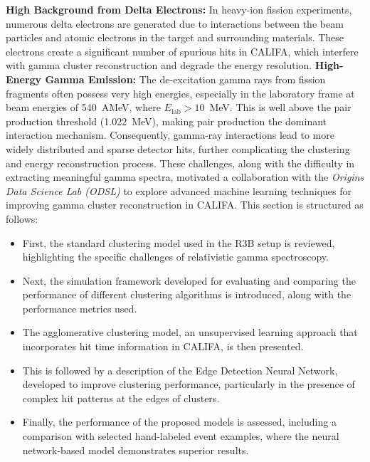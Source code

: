 \textbf{High Background from Delta Electrons:} In heavy-ion fission experiments, numerous delta electrons are generated due to interactions between the beam particles and atomic electrons in the target and surrounding materials. These electrons create a significant number of spurious hits in CALIFA, which interfere with gamma cluster reconstruction and degrade the energy resolution.\newline
\textbf{High-Energy Gamma Emission:} The de-excitation gamma rays from fission fragments often possess very high energies, especially in the laboratory frame at beam energies of 540~AMeV, where $E_{\text{lab}} > 10$~MeV. This is well above the pair production threshold (1.022~MeV), making pair production the dominant interaction mechanism. Consequently, gamma-ray interactions lead to more widely distributed and sparse detector hits, further complicating the clustering and energy reconstruction process.\newline
These challenges, along with the difficulty in extracting meaningful gamma spectra, motivated a collaboration with the \textit{Origins Data Science Lab (ODSL)} to explore advanced machine learning techniques for improving gamma cluster reconstruction in CALIFA.\newline
This section is structured as follows:
\begin{itemize}
    \setlength{\itemsep}{5pt}
    \item First, the standard clustering model used in the R3B setup is reviewed, highlighting the specific challenges of relativistic gamma spectroscopy.
    \item Next, the simulation framework developed for evaluating and comparing the performance of different clustering algorithms is introduced, along with the performance metrics used.
    \item The agglomerative clustering model, an unsupervised learning approach that incorporates hit time information in CALIFA, is then presented.
    \item This is followed by a description of the Edge Detection Neural Network, developed to improve clustering performance, particularly in the presence of complex hit patterns at the edges of clusters.
    \item Finally, the performance of the proposed models is assessed, including a comparison with selected hand-labeled event examples, where the neural network-based model demonstrates superior results.
\end{itemize}

